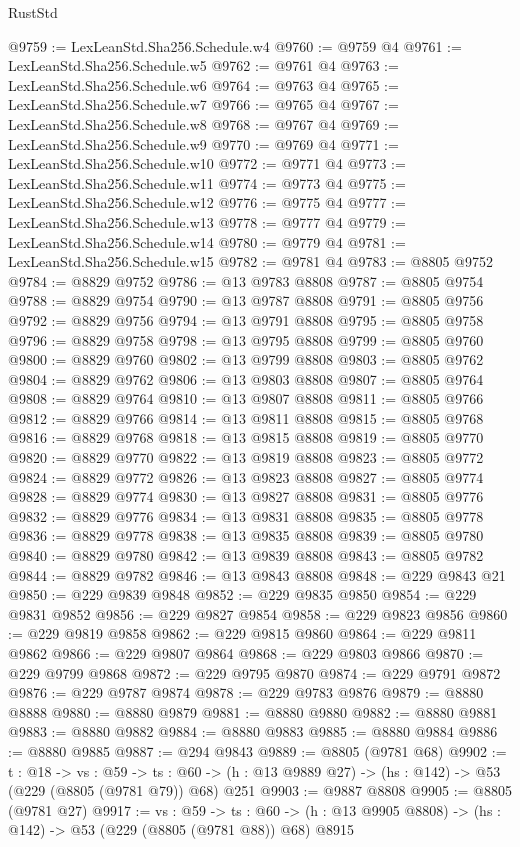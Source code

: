 \begin{lexlean}{RustStd}
\begin{coremodule}
@9759 := LexLeanStd.Sha256.Schedule.w4
@9760 := @9759 @4
@9761 := LexLeanStd.Sha256.Schedule.w5
@9762 := @9761 @4
@9763 := LexLeanStd.Sha256.Schedule.w6
@9764 := @9763 @4
@9765 := LexLeanStd.Sha256.Schedule.w7
@9766 := @9765 @4
@9767 := LexLeanStd.Sha256.Schedule.w8
@9768 := @9767 @4
@9769 := LexLeanStd.Sha256.Schedule.w9
@9770 := @9769 @4
@9771 := LexLeanStd.Sha256.Schedule.w10
@9772 := @9771 @4
@9773 := LexLeanStd.Sha256.Schedule.w11
@9774 := @9773 @4
@9775 := LexLeanStd.Sha256.Schedule.w12
@9776 := @9775 @4
@9777 := LexLeanStd.Sha256.Schedule.w13
@9778 := @9777 @4
@9779 := LexLeanStd.Sha256.Schedule.w14
@9780 := @9779 @4
@9781 := LexLeanStd.Sha256.Schedule.w15
@9782 := @9781 @4
@9783 := @8805 @9752
@9784 := @8829 @9752
@9786 := @13 @9783 @8808
@9787 := @8805 @9754
@9788 := @8829 @9754
@9790 := @13 @9787 @8808
@9791 := @8805 @9756
@9792 := @8829 @9756
@9794 := @13 @9791 @8808
@9795 := @8805 @9758
@9796 := @8829 @9758
@9798 := @13 @9795 @8808
@9799 := @8805 @9760
@9800 := @8829 @9760
@9802 := @13 @9799 @8808
@9803 := @8805 @9762
@9804 := @8829 @9762
@9806 := @13 @9803 @8808
@9807 := @8805 @9764
@9808 := @8829 @9764
@9810 := @13 @9807 @8808
@9811 := @8805 @9766
@9812 := @8829 @9766
@9814 := @13 @9811 @8808
@9815 := @8805 @9768
@9816 := @8829 @9768
@9818 := @13 @9815 @8808
@9819 := @8805 @9770
@9820 := @8829 @9770
@9822 := @13 @9819 @8808
@9823 := @8805 @9772
@9824 := @8829 @9772
@9826 := @13 @9823 @8808
@9827 := @8805 @9774
@9828 := @8829 @9774
@9830 := @13 @9827 @8808
@9831 := @8805 @9776
@9832 := @8829 @9776
@9834 := @13 @9831 @8808
@9835 := @8805 @9778
@9836 := @8829 @9778
@9838 := @13 @9835 @8808
@9839 := @8805 @9780
@9840 := @8829 @9780
@9842 := @13 @9839 @8808
@9843 := @8805 @9782
@9844 := @8829 @9782
@9846 := @13 @9843 @8808
@9848 := @229 @9843 @21
@9850 := @229 @9839 @9848
@9852 := @229 @9835 @9850
@9854 := @229 @9831 @9852
@9856 := @229 @9827 @9854
@9858 := @229 @9823 @9856
@9860 := @229 @9819 @9858
@9862 := @229 @9815 @9860
@9864 := @229 @9811 @9862
@9866 := @229 @9807 @9864
@9868 := @229 @9803 @9866
@9870 := @229 @9799 @9868
@9872 := @229 @9795 @9870
@9874 := @229 @9791 @9872
@9876 := @229 @9787 @9874
@9878 := @229 @9783 @9876
@9879 := @8880 @8888
@9880 := @8880 @9879
@9881 := @8880 @9880
@9882 := @8880 @9881
@9883 := @8880 @9882
@9884 := @8880 @9883
@9885 := @8880 @9884
@9886 := @8880 @9885
@9887 := @294 @9843
@9889 := @8805 (@9781 @68)
@9902 := {t : @18} ->
  {vs : @59} ->
  {ts : @60} -> (h : @13 @9889 @27) -> (hs : @142) -> @53 (@229 (@8805 (@9781 @79)) @68) @251
@9903 := @9887 @8808
@9905 := @8805 (@9781 @27)
@9917 := {vs : @59} ->
  {ts : @60} -> (h : @13 @9905 @8808) -> (hs : @142) -> @53 (@229 (@8805 (@9781 @88)) @68) @8915

\end{coremodule}
\end{lexlean}
